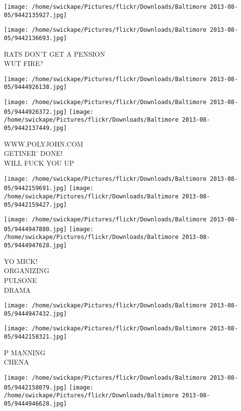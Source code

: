 \documentclass[10pt,letterpaper]{article}
\begin{document}
\texttt{[image: /home/swickape/Pictures/flickr/Downloads/Baltimore 2013-08-05/9442135927.jpg]}

\vspace{0.25in}
\texttt{[image: /home/swickape/Pictures/flickr/Downloads/Baltimore 2013-08-05/9442136693.jpg]}

RATS DON'T GET A PENSION\\
WUT FIRE?\\
\pagebreak

\texttt{[image: /home/swickape/Pictures/flickr/Downloads/Baltimore 2013-08-05/9444926138.jpg]}

\vspace{0.25in}
\texttt{[image: /home/swickape/Pictures/flickr/Downloads/Baltimore 2013-08-05/9444926372.jpg]}
\texttt{[image: /home/swickape/Pictures/flickr/Downloads/Baltimore 2013-08-05/9442137449.jpg]}

WWW.POLYJOHN.COM\\
GETINER' DONE!\\
WILL FUCK YOU UP\\
\pagebreak

\texttt{[image: /home/swickape/Pictures/flickr/Downloads/Baltimore 2013-08-05/9442159691.jpg]}
\texttt{[image: /home/swickape/Pictures/flickr/Downloads/Baltimore 2013-08-05/9442159427.jpg]}

\texttt{[image: /home/swickape/Pictures/flickr/Downloads/Baltimore 2013-08-05/9444947880.jpg]}
\texttt{[image: /home/swickape/Pictures/flickr/Downloads/Baltimore 2013-08-05/9444947628.jpg]}

YO MICK!\\
ORGANIZING\\
PULSONE\\
DRAMA\\
\pagebreak

\texttt{[image: /home/swickape/Pictures/flickr/Downloads/Baltimore 2013-08-05/9444947432.jpg]}

\vspace{0.25in}
\texttt{[image: /home/swickape/Pictures/flickr/Downloads/Baltimore 2013-08-05/9442158321.jpg]}

P MANNING\\
CHENA\\
\pagebreak

\texttt{[image: /home/swickape/Pictures/flickr/Downloads/Baltimore 2013-08-05/9442158079.jpg]}
\texttt{[image: /home/swickape/Pictures/flickr/Downloads/Baltimore 2013-08-05/9444946628.jpg]}
\end{document}
